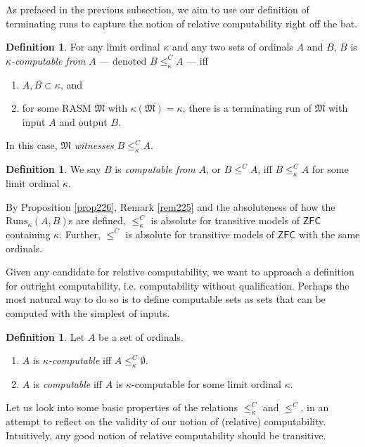 \documentclass[12pt, twoside]{memoir}
\numberwithin{equation}{section}
\theoremstyle{definition}
\newtheorem{defi}[thm]{Definition}
\theoremstyle{remark}
\theoremstyle{definition}
\theoremstyle{definition}
\theoremstyle{definition}
\theoremstyle{remark}
\begin{document}
As prefaced in the previous subsection, we aim to use our definition of terminating runs to capture the notion of relative computability right off the bat.

\begin{defi}
For any limit ordinal $\kappa$ and any two sets of ordinals $A$ and $B$, $B$ is $\kappa$\emph{-computable from} $A$ --- denoted $B \leq^C_{\kappa} A$ --- iff
\begin{enumerate}[label=(\alph*)]
    \item $A, B \subset \kappa$, and
    \item for some RASM $\mathfrak{M}$ with $\kappa(\mathfrak{M}) = \kappa$, there is a terminating run of $\mathfrak{M}$ with input $A$ and output $B$. 
\end{enumerate}
In this case, $\mathfrak{M}$ \emph{witnesses} $B \leq^C_{\kappa} A$.
\end{defi}

\begin{defi}
We say $B$ is \emph{computable from} $A$, or $B \leq^C A$, iff $B \leq^C_{\kappa} A$ for some limit ordinal $\kappa$.
\end{defi}

By Proposition \ref{prop226}, Remark \ref{rem225} and the absoluteness of how the $\mathrm{Runs}_{\kappa}(A, B)$s are defined, $\leq^C_{\kappa}$ is absolute for transitive models of $\mathsf{ZFC}$ containing $\kappa$. Further, $\leq^C$ is absolute for transitive models of $\mathsf{ZFC}$ with the same ordinals. 

Given any candidate for relative computability, we want to approach a definition for outright computability, i.e. computability without qualification. Perhaps the most natural way to do so is to define computable sets as sets that can be computed with the simplest of inputs. 

\begin{defi}
Let $A$ be a set of ordinals.
\begin{enumerate}[label=(\arabic*)]
    \item $A$ is $\kappa$\emph{-computable} iff $A \leq^C_{\kappa} \emptyset$.
    \item $A$ is \emph{computable} iff $A$ is $\kappa$-computable for some limit ordinal $\kappa$.
\end{enumerate}
\end{defi}

Let us look into some basic properties of the relations $\leq^C_{\kappa}$ and $\leq^C$, in an attempt to reflect on the validity of our notion of (relative) computability. Intuitively, any good notion of relative computability should be transitive. 
\end{document}
